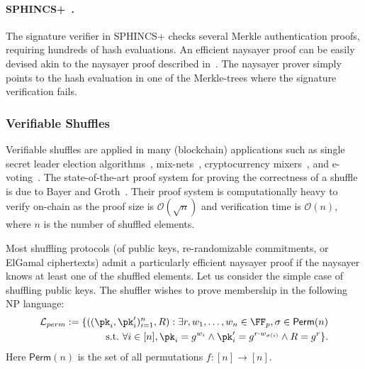 \paragraph{SPHINCS+~\cite{CCS:BHKNRS19}.}  The signature verifier in SPHINCS+ checks several Merkle authentication proofs, requiring hundreds of hash evaluations. An efficient naysayer proof can be easily devised akin to the naysayer proof described in~. The naysayer prover simply points to the hash evaluation in one of the Merkle-trees where the signature verification fails. 

\subsubsection{Verifiable Shuffles}\label{sec:vshuffle_naysayer}
Verifiable shuffles are applied in many (blockchain) applications such as single secret leader election algorithms~\cite{AFT:Boneh20}, mix-nets~\cite{CACM:Chaum81}, cryptocurrency mixers~\cite{EPRINT:SNBB19}, and e-voting~\cite{USENIX:Adida08}. The state-of-the-art proof system for proving the correctness of a shuffle is due to Bayer and Groth~\cite{EC:BayGro12}. Their proof system is computationally heavy to verify on-chain as the proof size is $\mathcal{O}(\sqrt{n})$ and verification time is $\mathcal{O}(n)$, where $n$ is the number of shuffled elements. 

Most shuffling protocols (of public keys, re-randomizable commitments, or ElGamal ciphertexts) admit a particularly efficient naysayer proof if the naysayer knows at least one of the shuffled elements. Let us consider the simple case of shuffling public keys. The shuffler wishes to prove membership in the following  NP language:
\begin{align*}%
    \Lang_{perm}:= \{ ((\pk_i,\pk_i')_{i=1}^n,R) : \exists r,\witness_1,\dots,\witness_n \in \FF_p, \sigma \in\mathsf{Perm}(n) \\
    \suchthat \forall i\in[n], \pk_i = g^{\witness_i} \land \pk_i' = g^{r \cdot \witness_{\sigma(i)}} \land R = g^r
    \}.
\end{align*}
Here $\mathsf{Perm}(n)$ is the set of all permutations $f:[n]\rightarrow[n]$.

